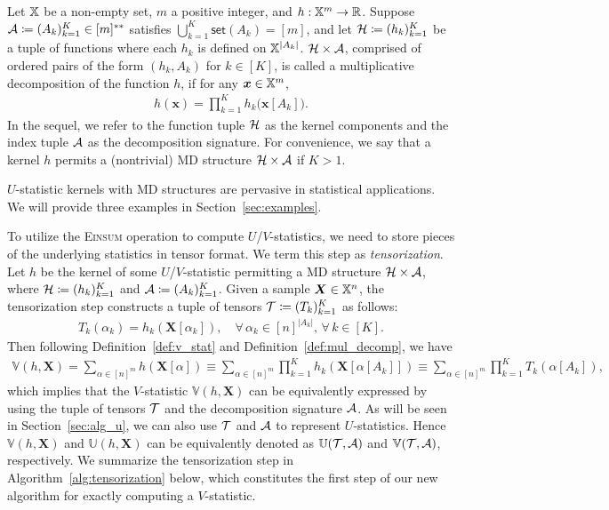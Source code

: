 \documentclass[letterpaper,11pt]{article}
\def\Einsum{\textsc{Einsum}}
\newcommand{\ustat}{\mathbb{U}}
\newcommand{\vstat}{\mathbb{V}}
\newcommand{\samplespace}{\bbX}
\newcommand{\takesetp}[1]{\mathsf{set}(#1)}
\begin{document}
\begin{bibunit}[plainnat]
\begin{definition}\label{def:mul_decomp}
Let $\samplespace$ be a non-empty set, $m$ a positive integer, and $h: \samplespace^m \to \bbR$. Suppose ${\mathcal{A}} \coloneqq (A_k)_{k=1}^K \in [m]^{**}$ satisfies $\bigcup_{k=1}^K \takesetp{A_k} = [m]$, and let ${\mathcal{H}} \coloneqq (h_k)_{k=1}^K$ be a tuple of functions where each $h_k$ is defined on $\samplespace^{|A_k|}$. ${\mathcal{H}} \times {\mathcal{A}}$, comprised of ordered pairs of the form $(h_{k}, A_{k})$ for $k \in [K]$, is called a multiplicative decomposition of the function $h$, if for any $\bm{x} \in \samplespace^m$, 
\begin{align*}
h(\bm{x}) = \prod_{k=1}^K h_k\big(\bm{x}[A_k]\big).
\end{align*}
In the sequel, we refer to the function tuple ${\mathcal{H}}$ as the kernel components and the index tuple ${\mathcal{A}}$ as the decomposition signature. For convenience, we say that a kernel $h$ permits a (nontrivial) MD structure ${\mathcal{H}} \times {\mathcal{A}}$ if $K > 1$.
\end{definition}

$U$-statistic kernels with MD structures are pervasive in statistical applications. We will provide three examples in Section~\ref{sec:examples}.

To utilize the \Einsum{} operation to compute $U$/$V$-statistics, we need to store pieces of the underlying statistics in tensor format. We term this step as \emph{tensorization}. Let $h$ be the kernel of some $U$/$V$-statistic permitting a MD structure ${\mathcal{H}} \times {\mathcal{A}}$, where ${\mathcal{H}} \coloneqq (h_k)_{k=1}^K$ and ${\mathcal{A}} \coloneqq (A_k)^K_{k=1}$. Given a sample $\bm{X} \in \samplespace^n$, the tensorization step constructs a tuple of tensors ${\mathcal{T}} \coloneqq (T_k)_{k=1}^K$ as follows:
\begin{align*}
T_k (\alpha_k) = h_k (\bm{X}[\alpha_k]), \quad \forall \, \alpha_k \in [n]^{|A_k|}, \, \forall \, k \in [K].
\end{align*}
Then following Definition~\ref{def:v_stat} and Definition~\ref{def:mul_decomp}, we have
\begin{align}\label{eq:tensorization_v}
\vstat(h, \bm{X}) = \sum_{\alpha \in [n]^m} h(\bm{X}[\alpha]) \equiv \sum_{\alpha \in [n]^m} \prod_{k=1}^K h_k(\bm{X}[\alpha[A_k]]) \equiv \sum_{\alpha \in [n]^m} \prod_{k=1}^K T_k(\alpha[A_k]), 
\end{align}
which implies that the $V$-statistic $\vstat(h, \bm{X})$ can be equivalently expressed by using the tuple of tensors ${\mathcal{T}}$ and the decomposition signature ${\mathcal{A}}$. As will be seen in Section~\ref{sec:alg_u}, we can also use ${\mathcal{T}}$ and ${\mathcal{A}}$ to represent $U$-statistics. Hence $\vstat(h, \bm{X})$ and $\ustat(h, \bm{X})$ can be equivalently denoted as $\ustat(\calT, \calA)$ and $\vstat(\calT, \calA)$, respectively. We summarize the tensorization step in Algorithm~\ref{alg:tensorization} below, which constitutes the first step of our new algorithm for exactly computing a $V$-statistic.


\end{bibunit}
\end{document}

